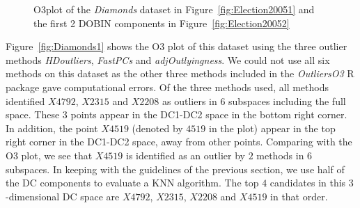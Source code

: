 \documentclass[a4paper,11pt]{article}
\begin{document}
\begin{figure}[!ht]
	\centering
	\caption{O3plot of the \textit{Diamonds} dataset in Figure~\ref{fig:Election20051} and the first 2 DOBIN components in Figure~\ref{fig:Election20052} }
	\label{fig:Diamonds}
\end{figure}

Figure~\ref{fig:Diamonds1} shows the O3 plot of this dataset using the three outlier methods \textit{HDoutliers}, \textit{FastPCs} and \textit{adjOutlyingness}. We could not use all six methods on this dataset as the other three methods included in the \textit{OutliersO3} R package gave computational errors. Of the three methods used, all methods identified $X4792$, $X2315$ and $X2208$ as outliers in 6 subspaces including the full space. These $3$ points appear in the DC1-DC2 space in the bottom right corner. In addition, the point $X4519$ (denoted by $4519$ in the plot) appear in the top right corner in the DC1-DC2 space, away from other points. Comparing with the O3 plot, we see that $X4519$ is identified as an outlier by $2$ methods in $6$ subspaces. In keeping with the guidelines of the previous section, we use half of the DC components to evaluate a KNN algorithm. The top $4$ candidates in this $3$-dimensional DC space are $X4792$, $X2315$, $X2208$ and $X4519$ in that order. \\
\end{document}
